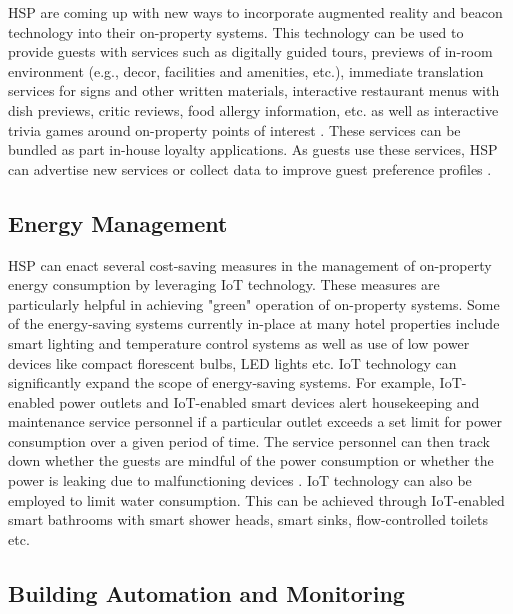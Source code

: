 \documentclass[10pt,journal,letterpaper]{IEEEtran}
\begin{document}
{HSP are coming up with new ways to incorporate augmented reality and beacon technology into their on-property systems. This technology can be used to provide guests with services such as digitally guided tours, previews of in-room environment (e.g., decor, facilities and amenities, etc.), immediate translation services for signs and other written materials, interactive restaurant menus with dish previews, critic reviews, food allergy information, etc. as well as interactive trivia games around on-property points of interest \cite{Tussyadiah_AugmentedReality_2017}. These services can be bundled as part in-house loyalty applications. As guests use these services, HSP can advertise new services or collect data to improve guest preference profiles \cite{HospitalityTech_BeaconsAugmentedReality_2015} \cite{Perey_AR_2015}.


\subsection*{Energy Management}

HSP can enact several cost-saving measures in the management of on-property energy consumption by leveraging IoT technology. These measures are particularly helpful in achieving "green" operation of on-property systems.
Some of the energy-saving systems currently in-place at many hotel properties include smart lighting and temperature control systems as well as use of low power devices like compact florescent bulbs, LED lights etc. IoT technology can significantly expand the scope of energy-saving systems. For example, IoT-enabled power outlets and IoT-enabled smart devices alert housekeeping and maintenance service personnel if a particular outlet exceeds a set limit for power consumption over a given period of time. The service personnel can then track down whether the guests are mindful of the power consumption or whether the power is leaking due to malfunctioning devices\cite{Lee_Energy_2018} \cite{Hsiao_Energy_2018}. IoT technology can also be employed to limit water consumption. This can be achieved through IoT-enabled smart bathrooms with smart shower heads, smart sinks, flow-controlled toilets etc.


\subsection*{Building Automation and Monitoring}

}
\end{document}
